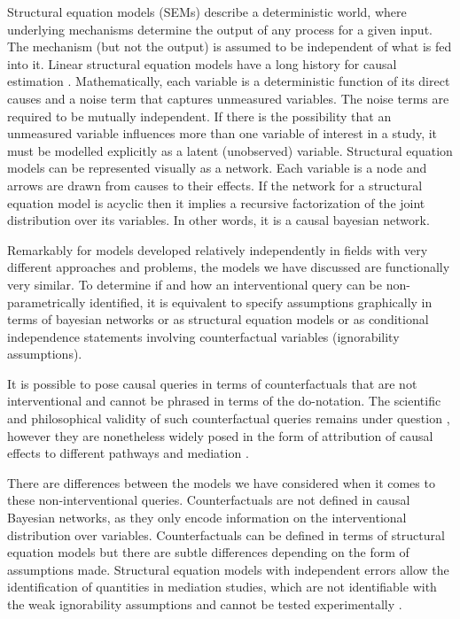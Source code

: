 \documentclass[11pt,a4paper]{article}
\begin{document}
Structural equation models (SEMs) describe a deterministic world, where underlying mechanisms determine the output of any process for a given input. The mechanism (but not the output) is assumed to be independent of what is fed into it. Linear structural equation models have a long history for causal estimation \cite {Wright1921,Haavelmo1943}. Mathematically, each variable is a deterministic function of its direct causes and a noise term that captures unmeasured variables. The noise terms are required to be mutually independent. If there is the possibility that an unmeasured variable influences more than one variable of interest in a study, it must be modelled explicitly as a latent (unobserved) variable. Structural equation models can be represented visually as a network. Each variable is a node and arrows are drawn from causes to their effects. If the network for a structural equation model is acyclic then it implies a recursive factorization of the joint distribution over its variables. In other words, it is a causal bayesian network. 

Remarkably for models developed relatively independently in fields with very different approaches and problems, the models we have discussed are functionally very similar. To determine if and how an interventional query can be non-parametrically identified, it is equivalent to specify assumptions graphically in terms of bayesian networks or as structural equation models or as conditional independence statements involving counterfactual variables (ignorability assumptions). 

It is possible to pose causal queries in terms of counterfactuals that are not interventional and cannot be phrased in terms of the do-notation. The scientific and philosophical validity of such counterfactual queries remains under question \cite{Dawid2000,Dawid2014}, however they are nonetheless widely posed in the form of attribution of causal effects to different pathways and mediation \cite{Pearl2014,Imai2010a,VanderWeele2011}. 

There are differences between the models we have considered when it comes to these non-interventional queries. Counterfactuals are not defined in causal Bayesian networks, as they only encode information on the interventional distribution over variables.  Counterfactuals can be defined in terms of structural equation models \cite{Pearl2000} but there are subtle differences depending on the form of assumptions made. Structural equation models with independent errors allow the identification of quantities in mediation studies, which are not identifiable with the weak ignorability assumptions and cannot be tested experimentally \cite{Richardson2013}.  
\end{document}
